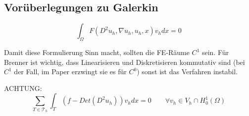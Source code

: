 \subsection*{Vorüberlegungen zu Galerkin}

\[
\int_\Omega F(D^2 u_h, \nabla u_h, u_h, x)v_h dx = 0
\]

Damit diese Formulierung Sinn macht, sollten die FE-Räume $C^1$ sein.
Für Brenner ist wichtig, dass Linearisieren und Diskretisieren kommutativ sind (bei $C^1$ der Fall, im Paper \cite{Brenner2012} erzwingt sie es für $C^0$) sonst ist das Verfahren instabil.

ACHTUNG:
\[
\sum_{T \in \mathcal{T}_h} \int_T(f-Det(D^2 u_h))v_h dx = 0 \qquad \forall v_h \in V_h \cap H_0^1(\Omega)
\]

